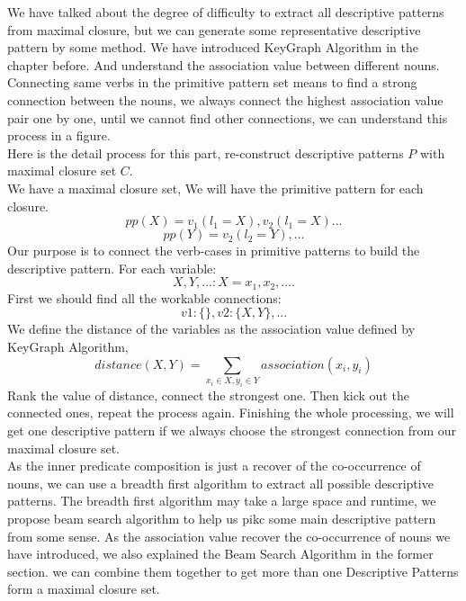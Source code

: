 We have talked about the degree of difficulty to extract all descriptive patterns from maximal closure, but we can generate some representative descriptive pattern by some method. We have introduced KeyGraph Algorithm in the chapter before. And understand the association value between different nouns. Connecting same verbs in the primitive pattern set means to find a strong connection between the nouns, we always connect the highest association value pair one by one, until we cannot find other connections, we can understand this process in a figure.\\
Here is the detail process for this part, re-construct descriptive patterns $P$ with maximal closure set $C$.\\
We have a maximal closure set, We will have the primitive pattern for each closure.\\
\begin{displaymath}
pp(X) = v_1(l_1 = X), v_2 (l_1 = X)...
\end{displaymath}
\begin{displaymath}
pp(Y) = v_2(l_2 =Y),...
\end{displaymath}
Our purpose is to connect the verb-cases in primitive patterns to build the descriptive pattern. For each variable:
\begin{displaymath}
X, Y,... :X = {x_1, x_2,....}
\end{displaymath}
First we should find all the workable connections:
\begin{displaymath}
v1:\{\},v2:\{X,Y\},...
\end{displaymath}
We define the distance of the variables as the association value defined by KeyGraph Algorithm,
\begin{displaymath}
distance(X, Y) = \sum_{x_i \in X, y_i \in Y} association(x_i, y_i)
\end{displaymath}
Rank the value of distance, connect the strongest one. Then kick out the connected ones, repeat the process again. Finishing the whole processing, we will get one descriptive pattern if we always choose the strongest connection from our maximal closure set.\\
As the inner predicate composition is just a recover of the co-occurrence of nouns, we can use a breadth first algorithm to extract all possible descriptive patterns. The breadth first algorithm may take a large space and runtime, we propose beam search algorithm to help us pikc some main descriptive pattern from some sense.
As the association value recover the co-occurrence of nouns we have introduced, we also explained the Beam Search Algorithm in the former section. we can combine them together to get more than one Descriptive Patterns form a maximal closure set.\\
